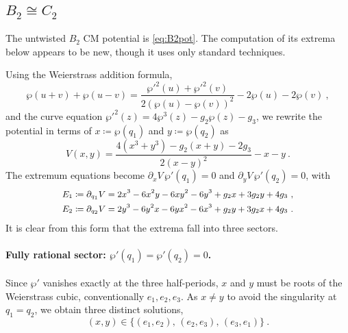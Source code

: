 \documentclass[aps, prx, nofootinbib, twocolumn,amsfonts,amsmath,amssymb,mathtools,superscriptaddress,preprintnumbers,floatfix,reprint]{revtex4-2}
\begin{document}
\subsection{\texorpdfstring{$B_2\cong C_2$}{B2=C2}}
\label{sub:CMB2}

The untwisted $B_2$ CM potential is \eqref{eq:B2pot}. The computation of its
extrema below appears to be new, though it uses only standard techniques.

Using the Weierstrass addition formula, 
\begin{equation}
\wp(u+v)+\wp(u-v)=\dfrac{\wp'^2(u)+\wp'^2(v)}{2(\wp(u)-\wp(v))^2} -2\wp(u)-2\wp(v)\ ,
\end{equation}
and the curve equation $\wp'^2(z)=4\wp^3(z)-g_2\wp(z)-g_3$, we rewrite the
potential in terms of $x\coloneqq \wp(q_1)$ and $y\coloneqq \wp(q_2)$ as
\begin{equation}
  V(x,y)=\frac{4(x^3+y^3)-g_2(x+y)-2g_3}{2(x-y)^2}-x-y\ .
\end{equation}
The extremum equations become
$\partial_xV\,\wp'(q_1)=0$ and $\partial_yV\,\wp'(q_2)=0$, with
\begin{subequations}
{\small
\begin{align}
  E_1&\coloneqq\partial_{q_1}V=2x^3-6x^2y-6xy^2-6y^3+g_2x+3g_2y+4g_3\ ,\\
  E_2&\coloneqq\partial_{q_2}V=2y^3-6y^2x-6yx^2-6x^3+g_2y+3g_2x+4g_3\ .
\end{align}}
\end{subequations}
It is clear from this form that the extrema fall into three sectors.

\paragraph{Fully rational sector: \texorpdfstring{$\wp'(q_1)=\wp'(q_2)=0$}{}.}
Since $\wp'$ vanishes exactly at the three half-periods, $x$ and $y$ must be
roots of the Weierstrass cubic, conventionally $e_1,e_2,e_3$. As $x\neq y$ to
avoid the singularity at $q_1=q_2$, we obtain three distinct solutions,
\begin{equation}
  (x,y)\in\big\{(e_1,e_2),\,(e_2,e_3),\,(e_3,e_1)\big\}\ .
\end{equation}
\end{document}
